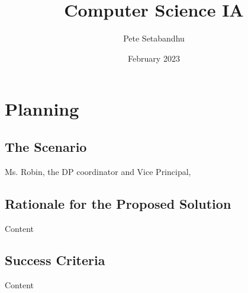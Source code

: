 \documentclass{article}
\title{Computer Science IA}
\author{Pete Setabandhu}
\date{February 2023}
\begin{document}
\maketitle

\section{Planning}

\subsection{The Scenario}
Ms. Robin, the DP coordinator and Vice Principal, 

\subsection{Rationale for the Proposed Solution}
Content

\subsection{Success Criteria}
Content





\end{document}
